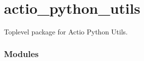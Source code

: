 \documentclass[letterpaper,10pt,english]{sphinxmanual}
\begin{document}
\sphinxstepscope


\section{actio\_python\_utils}
\label{\detokenize{_autosummary/actio_python_utils:module-actio_python_utils}}\label{\detokenize{_autosummary/actio_python_utils:actio-python-utils}}\label{\detokenize{_autosummary/actio_python_utils::doc}}
\sphinxAtStartPar
Top\sphinxhyphen{}level package for Actio Python Utils.
\subsubsection*{Modules}
\end{document}

